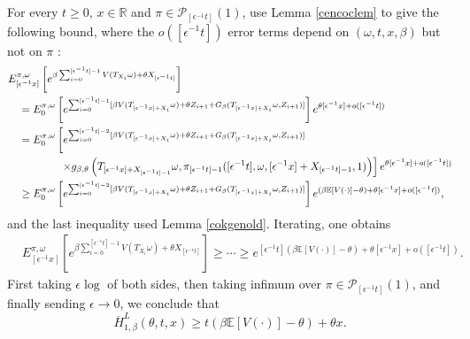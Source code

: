\documentclass[a4paper]{amsart}
\numberwithin{equation}{section}
\theoremstyle{plain}
\theoremstyle{remark}
\begin{document}
For every $t\ge0$, $x\in\mathbb{R}$ and $\pi\in\mathcal{P}_{[{\epsilon^{-1}} t]}(1)$, 
use Lemma \ref{cencoclem} to 
give the following bound, 
{}{where the $o([\epsilon^{-1} t])$ error terms
depend on $(\omega,t,x,\beta)$ but not on $\pi$ :}
\begin{align*}
&E_{[{\epsilon^{-1}} x]}^{\pi,\omega}\left[e^{\beta\sum_{i=0}^{[{\epsilon^{-1}} t]-1} V(T_{X_i}\omega) + \theta X_{[{\epsilon^{-1}} t]}}\right]\nonumber\\
&\quad = E_0^{\pi,\omega}\left[e^{\sum_{i=0}^{[{\epsilon^{-1}} t]-1} [\beta V(T_{[{\epsilon^{-1}} x] + X_i}\omega) + \theta Z_{i+1} + G_\beta(T_{[{\epsilon^{-1}} x] + X_i}\omega,Z_{i+1})]}\right]e^{\theta[{\epsilon^{-1}} x] + o([{\epsilon^{-1}} t])}\nonumber\\
&\quad = E_0^{\pi,\omega}\left[e^{\sum_{i=0}^{[{\epsilon^{-1}} t]-2} [\beta V(T_{[{\epsilon^{-1}} x] + X_i}\omega) + \theta Z_{i+1} + G_\beta(T_{[{\epsilon^{-1}} x] + X_i}\omega,Z_{i+1})]}\right.\nonumber\\
&\hspace{17mm}\left.\times g_{\beta,\theta}\left(T_{[{\epsilon^{-1}} x] + X_{[{\epsilon^{-1}} t]-1}}\omega,\pi_{[{\epsilon^{-1}} t]-1}([{\epsilon^{-1}} t],\omega,[{\epsilon^{-1}} x] + X_{[{\epsilon^{-1}} t]-1},1)\right)\right]e^{\theta[{\epsilon^{-1}} x] + o([{\epsilon^{-1}} t])}\nonumber\\
&\quad \ge E_0^{\pi,\omega}\left[e^{\sum_{i=0}^{[{\epsilon^{-1}} t]-2} [\beta V(T_{[{\epsilon^{-1}} x] + X_i}\omega) + \theta Z_{i+1} + G_\beta(T_{[{\epsilon^{-1}} x] + X_i}\omega,Z_{i+1})]}\right]e^{(\beta\mathbb{E}[V(\cdot)] - \theta) + \theta[{\epsilon^{-1}} x] + o([{\epsilon^{-1}} t])},
\end{align*}
{}{and the
  last inequality used Lemma \ref{cokgenold}. Iterating, one obtains} 
\begin{align}
&E_{[{\epsilon^{-1}} x]}^{\pi,\omega}\left[e^{\beta\sum_{i=0}^{[{\epsilon^{-1}} t]-1} V(T_{X_i}\omega) + \theta X_{[{\epsilon^{-1}} t]}}\right]
\ge\cdots\ge e^{[{\epsilon^{-1}} t](\beta\mathbb{E}[V(\cdot)] - \theta) + \theta[{\epsilon^{-1}} x] + o([{\epsilon^{-1}} t])}.\label{takpat}
\end{align}
First taking ${\epsilon}\log$ of both sides, then taking infimum over $\pi\in\mathcal{P}_{[{\epsilon^{-1}} t]}(1)$, and finally sending ${\epsilon}\to0$, we conclude that
\begin{equation}\label{LBfull1}
\overline H_{1,\beta}^L(\theta,t,x) \ge t(\beta\mathbb{E}[V(\cdot)] - \theta) + \theta x.
\end{equation}
\end{document}
